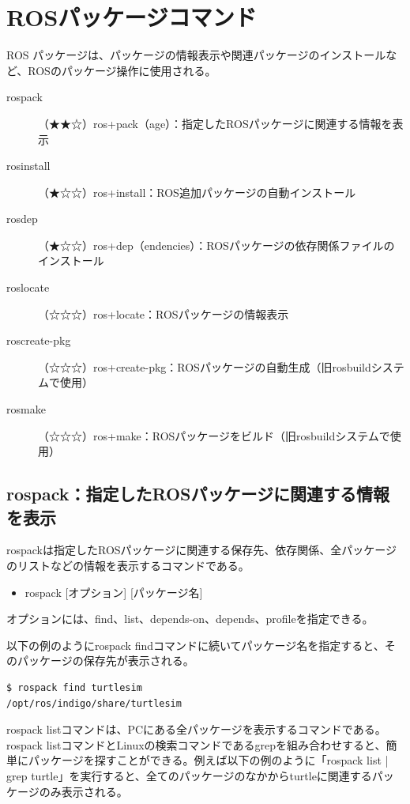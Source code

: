\section{ROSパッケージコマンド}
ROS パッケージは、パッケージの情報表示や関連パッケージのインストールなど、ROSのパッケージ操作に使用される。

\vspace{\baselineskip}
\noindent
\begin{description}
\item[rospack]（★★☆）ros+pack（age）：指定したROSパッケージに関連する情報を表示
\item[rosinstall]（★☆☆）ros+install：ROS追加パッケージの自動インストール
\item[rosdep]（★☆☆）ros+dep（endencies）：ROSパッケージの依存関係ファイルのインストール
\item[roslocate]（☆☆☆）ros+locate：ROSパッケージの情報表示
\item[roscreate-pkg]（☆☆☆）ros+create-pkg：ROSパッケージの自動生成（旧rosbuildシステムで使用）
\item[rosmake]（☆☆☆）ros+make：ROSパッケージをビルド（旧rosbuildシステムで使用）
\end{description}

\subsection{rospack：指定したROSパッケージに関連する情報を表示}

rospackは指定したROSパッケージに関連する保存先、依存関係、全パッケージのリストなどの情報を表示するコマンドである。

\begin{itemize}
\item  rospack [オプション] [パッケージ名]
\end{itemize}

オプションには、find、list、depends-on、depends、profileを指定できる。

以下の例のようにrospack findコマンドに続いてパッケージ名を指定すると、そのパッケージの保存先が表示される。

\begin{lstlisting}[language=ROS]
$ rospack find turtlesim
/opt/ros/indigo/share/turtlesim
\end{lstlisting}

rospack listコマンドは、PCにある全パッケージを表示するコマンドである。rospack listコマンドとLinuxの検索コマンドであるgrepを組み合わせすると、簡単にパッケージを探すことができる。例えば以下の例のように「rospack list | grep turtle」を実行すると、全てのパッケージのなかからturtleに関連するパッケージのみ表示される。

